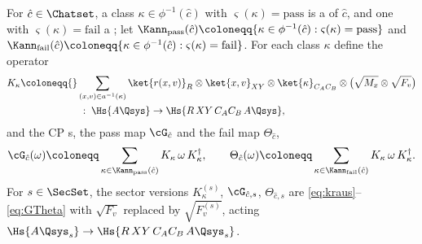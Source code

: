 
\begin{definition}\label{def:branch}
For $\hat c\in\Chatset$, a class $\kappa\in\phi^{-1}(\hat c)$ with
$\varsigma(\kappa)=\mathrm{pass}$ is a
of $\hat c$, and one with $\varsigma(\kappa)=\mathrm{fail}$ a
;
let
$\Kann_{\mathrm{pass}}(\hat c)\coloneqq
\{\kappa\in\phi^{-1}(\hat c):\varsigma(\kappa)=\mathrm{pass}\}$ and
$\Kann_{\mathrm{fail}}(\hat c)\coloneqq
\{\kappa\in\phi^{-1}(\hat c):\varsigma(\kappa)=\mathrm{fail}\}$. For each
class $\kappa$ define the operator
\begin{equation}\label{eq:kraus}
\begin{split}
  K_{\kappa}\coloneqq{}&\sum_{(x,v)\in a^{-1}(\kappa)}
  \ket{r(x,v)}_{R}\otimes\ket{x,v}_{XY}\otimes\ket{\kappa}_{C_AC_B}
  \otimes\big(\sqrt{M_x}\otimes\sqrt{F_v}\big)\\
  &\;:\;\Hs{A\Qsys}\to\Hs{R\,XY\,C_AC_B\,A\Qsys},
\end{split}
\end{equation}
and the CP
s,
the pass map $\cG_{\hat c}$ and the fail map $\Theta_{\hat c}$,
\begin{equation}\label{eq:GTheta}
  \cG_{\hat c}(\omega)\coloneqq
  \sum_{\kappa\in\Kann_{\mathrm{pass}}(\hat c)}K_{\kappa}\,\omega\,
  K_{\kappa}^{\dagger},
  \qquad
  \Theta_{\hat c}(\omega)\coloneqq
  \sum_{\kappa\in\Kann_{\mathrm{fail}}(\hat c)}K_{\kappa}\,\omega\,
  K_{\kappa}^{\dagger}.
\end{equation}
For $s\in\SecSet$, the sector versions $K_{\kappa}^{(s)}$, $\cG_{\hat c,s}$,
$\Theta_{\hat c,s}$ are \eqref{eq:kraus}--\eqref{eq:GTheta} with
$\sqrt{F_v}$ replaced by $\sqrt{F_v^{(s)}}$, acting
$\Hs{A\Qsys_s}\to\Hs{R\,XY\,C_AC_B\,A\Qsys_s}$.
\end{definition}

